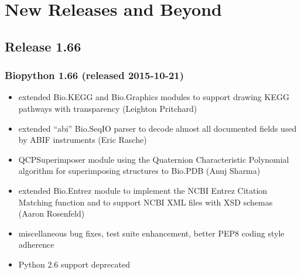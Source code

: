 \documentclass[trans]{beamer}
\begin{document}

\section{New Releases and Beyond}
\subsection*{Release 1.66}
\frame
{
  \frametitle{Biopython 1.66 (released 2015-10-21)}

  \begin{itemize}
  \item extended Bio.KEGG and Bio.Graphics modules to support drawing KEGG pathways with transparency (Leighton Pritchard)
  \item extended ``abi'' Bio.SeqIO parser to decode almost all documented fields used by ABIF instruments (Eric Rasche)
  \item QCPSuperimposer module using the Quaternion Characteristic Polynomial algorithm for superimposing structures to Bio.PDB (Anuj Sharma)
  \item extended Bio.Entrez module to implement the NCBI Entrez Citation Matching function and to support NCBI XML files with XSD schemas (Aaron Rosenfeld)
  \item miscellaneous bug fixes, test suite enhancement, better PEP8 coding style adherence
  \item Python 2.6 support deprecated
  \end{itemize}
}
\frame
\end{document}

